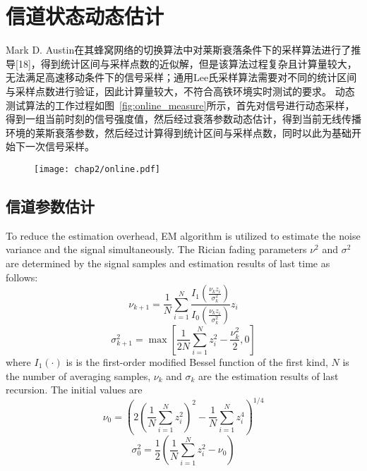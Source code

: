 \section{信道状态动态估计}
\label{sec:dynamic}

Mark D. Austin在其蜂窝网络的切换算法中对莱斯衰落条件下的采样算法进行了推导[18]，得到统计区间与采样点数的近似解，但是该算法过程复杂且计算量较大，无法满足高速移动条件下的信号采样；通用Lee氏采样算法需要对不同的统计区间与采样点数进行验证，因此计算量较大，不符合高铁环境实时测试的要求。
动态测试算法的工作过程如图~\ref{fig:online_measure}所示，首先对信号进行动态采样，得到一组当前时刻的信号强度值，然后经过衰落参数动态估计，得到当前无线传播环境的莱斯衰落参数，然后经过计算得到统计区间与采样点数，同时以此为基础开始下一次信号采样。

\begin{figure}[!htp]
\centering
\texttt{[image: chap2/online.pdf]}
\end{figure}

\subsection{信道参数估计}
\label{sec:estimation}

To reduce the estimation overhead, EM algorithm \cite{marzetta1995algorithm} is utilized to estimate the noise variance and the signal simultaneously. The Rician fading parameters $\nu^2$ and $\sigma^2$ are determined by the signal samples and estimation results of last time as follows:
\begin{equation}
    \nu_{k+1}=\frac{1}{N}\sum_{i=1}^{N}\frac{I_{1}\left(\frac{\nu_{k}z_{i}}{\sigma_k^2}\right)}{I_{0}\left(\frac{\nu_{k}z_{i}}{\sigma_k^2}\right)}z_i
\label{EM_nu}
\end{equation}
\begin{equation}
    \sigma_{k+1}^2=\max{\left[\frac{1}{2N}\sum_{i=1}^N z_i^2 -\frac{\nu_k^2}{2},0\right]}
\label{EM_sigma}
\end{equation}
where $I_1(\cdot)$ is is the first-order modified Bessel function of the first kind, $N$ is the number of averaging samples, $\nu_k$ and $\sigma_k$ are the estimation results of last recursion. The initial values are
\begin{equation}
    \nu_{0}=\left(2\left(\frac{1}{N}\sum_{i=1}^N z_i^2\right)^2-\frac{1}{N}\sum_{i=1}^N z_i^4\right)^{1/4}
\label{nu_0}
\end{equation}
\begin{equation}
    \sigma_{0}^2=\frac{1}{2}\left(\frac{1}{N}\sum_{i=1}^N z_i^2 - \nu_{0}\right)
\label{sigma_0}
\end{equation}

